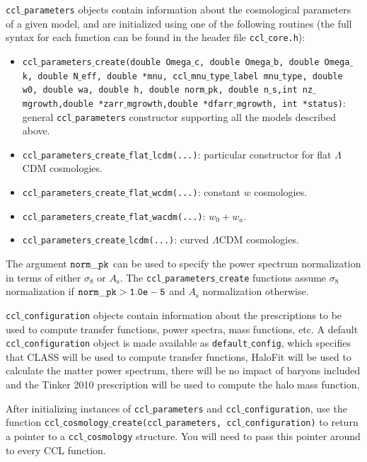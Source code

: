\documentclass[\docopts]{\docclass}
\begin{document}


{\tt ccl$\_$parameters} objects contain information about the cosmological parameters of a given model, and are initialized using one of the following routines (the full syntax for each function can be found in the header file {\tt ccl$\_$core.h}):
\begin{itemize}
 \item {\tt ccl$\_$parameters$\_$create(double Omega$\_$c, double Omega$\_$b, double Omega$\_$k, double N$\_$eff, double *mnu, ccl$\_$mnu$\_$type$\_$label mnu$\_$type, double w0, double wa, double h, double norm$\_$pk, double n$\_$s,int nz$\_$mgrowth,double *zarr$\_$mgrowth,double *dfarr$\_$mgrowth, int *status)}: general {\tt ccl$\_$parameters} constructor supporting all the models described above.
 \item {\tt ccl$\_$parameters$\_$create$\_$flat$\_$lcdm(...)}: particular constructor for flat $\Lambda$CDM cosmologies.
 \item {\tt ccl$\_$parameters$\_$create$\_$flat$\_$wcdm(...)}: constant $w$ cosmologies.
 \item {\tt ccl$\_$parameters$\_$create$\_$flat$\_$wacdm(...)}: $w_0+w_a$.
 \item {\tt ccl$\_$parameters$\_$create$\_$lcdm(...)}: curved $\Lambda$CDM cosmologies.
\end{itemize}
The argument ${\tt norm\_pk}$ can be used to specify the power spectrum normalization in terms of either $\sigma_8$ or $A_\mathrm{s}$. The {\tt ccl$\_$parameters$\_$create} functions assume $\sigma_8$ normalization if ${\tt norm\_pk > 1.0e-5}$ and $A_{\mathrm s}$ normalization otherwise.

{\tt ccl$\_$configuration} objects contain information about the prescriptions to be used to compute transfer functions, power spectra, mass functions, etc. A default {\tt ccl$\_$configuration} object is made available as {\tt default$\_$config}, which specifies that CLASS will be used to compute transfer functions, HaloFit will be used to calculate the matter power spectrum, there will be no impact of baryons included and the Tinker 2010 prescription will be used to compute the halo mass function.

After initializing instances of {\tt ccl$\_$parameters} and {\tt ccl$\_$configuration}, use the function {\tt ccl$\_$cosmology$\_$create(ccl$\_$parameters, ccl$\_$configuration)} to return a pointer to a {\tt ccl$\_$cosmology} structure. You will need to pass this pointer around to every CCL function.
\end{document}
